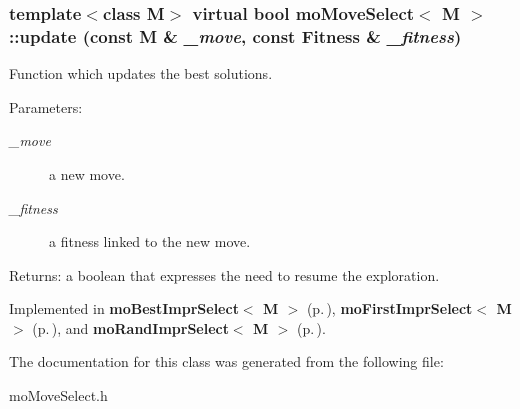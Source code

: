 \subsubsection{\setlength{\rightskip}{0pt plus 5cm}template$<$class M$>$ virtual bool {\bf mo\-Move\-Select}$<$ M $>$::update (const M \& {\em \_\-move}, const {\bf Fitness} \& {\em \_\-fitness})\hspace{0.3cm}{\tt  [pure virtual]}}\label{classmo_move_select_a1}


Function which updates the best solutions. 

\begin{Desc}
\item[Parameters:]
\begin{description}
\item[{\em \_\-move}]a new move. \item[{\em \_\-fitness}]a fitness linked to the new move. \end{description}
\end{Desc}
\begin{Desc}
\item[Returns:]a boolean that expresses the need to resume the exploration. \end{Desc}


Implemented in {\bf mo\-Best\-Impr\-Select$<$ M $>$} {\rm (p.\,\pageref{classmo_best_impr_select_a1})}, {\bf mo\-First\-Impr\-Select$<$ M $>$} {\rm (p.\,\pageref{classmo_first_impr_select_a1})}, and {\bf mo\-Rand\-Impr\-Select$<$ M $>$} {\rm (p.\,\pageref{classmo_rand_impr_select_a1})}.

The documentation for this class was generated from the following file:\begin{CompactItemize}
\item 
mo\-Move\-Select.h\end{CompactItemize}
